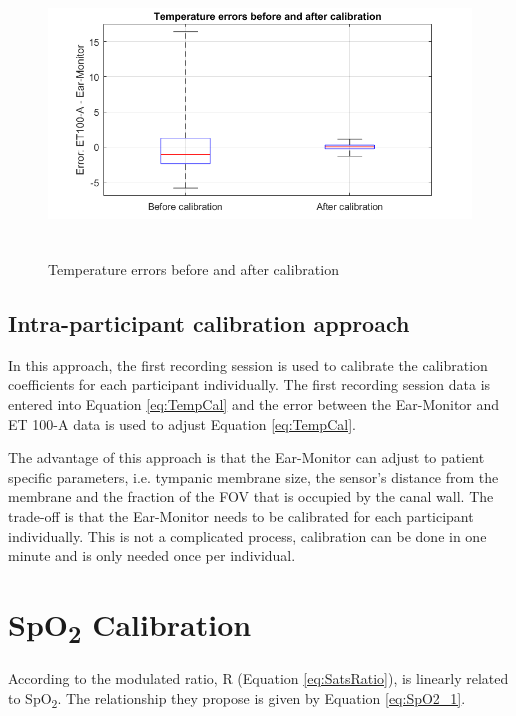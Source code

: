 \begin{figure}[H]
   \centering
   \includegraphics[width=12cm,height=7.5cm]{figs/BeforeAfterCalibrationBoxplot.png}
   \caption{Temperature errors before and after calibration}
   \label{fig:BeforeAfterCalibrationBoxplot}
\end{figure}


\subsection{Intra-participant calibration approach}
In this approach, the first recording session is used to calibrate the calibration coefficients for each participant individually. The first recording session data is entered into Equation \ref{eq:TempCal} and the error between the Ear-Monitor and ET 100-A data is used to adjust Equation \ref{eq:TempCal}.

\medskip

The advantage of this approach is that the Ear-Monitor can adjust to patient specific parameters, i.e. tympanic membrane size, the sensor's distance from the membrane and the fraction of the FOV that is occupied by the canal wall. The trade-off is that the Ear-Monitor needs to be calibrated for each participant individually. This is not a complicated process, calibration can be done in one minute and is only needed once per individual. 

\section{SpO\textsubscript{2} Calibration}
According to \cite{ti2012application} the modulated ratio, R (Equation \ref{eq:SatsRatio}), is linearly related to SpO\textsubscript{2}. The relationship they propose is given by Equation \ref{eq:SpO2_1}.

